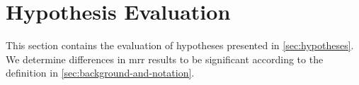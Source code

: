 \section{Hypothesis Evaluation}
\label{sec:hypothesis_evaluation}

This section contains the evaluation of hypotheses presented in \autoref{sec:hypotheses}. We determine differences in \gls{mrr} results to be significant according to the definition in \autoref{sec:background-and-notation}.



